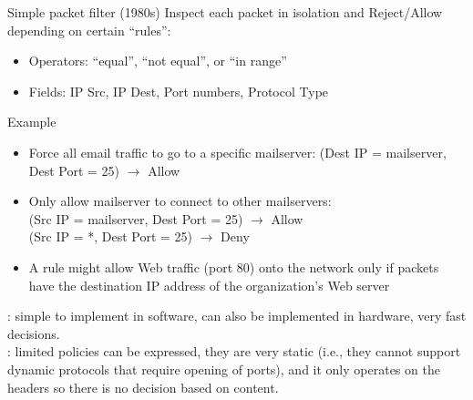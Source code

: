 \begin{parag}{Simple packet filter (1980s)}
    Inspect each packet in isolation and Reject/Allow depending on certain ``rules'':
	\begin{itemize}
	    \item Operators: ``equal'', ``not equal'', or ``in range''
	    \item Fields: IP Src, IP Dest, Port numbers, Protocol Type
	\end{itemize}
	\begin{subparag}{Example}
		\begin{itemize}
		    \item Force all email traffic to go to a specific mailserver: (Dest IP = mailserver, Dest Port = 25) $\to$ Allow
		    \item Only allow mailserver to connect to other mailservers:\\
				(Src IP = mailserver, Dest Port = 25) $\to$ Allow\\
				(Src IP = *, Dest Port = 25) $\to$ Deny
		    \item A rule might allow Web traffic (port 80) onto the network only if packets have the destination IP address of the organization's Web server
		\end{itemize}
	\end{subparag}
	: simple to implement in software, can also be implemented in hardware, very fast decisions.\\
	: limited policies can be expressed, they are very static (i.e., they cannot support dynamic protocols that require opening of ports), and it only operates on the headers so there is no decision based on content.
\end{parag}

